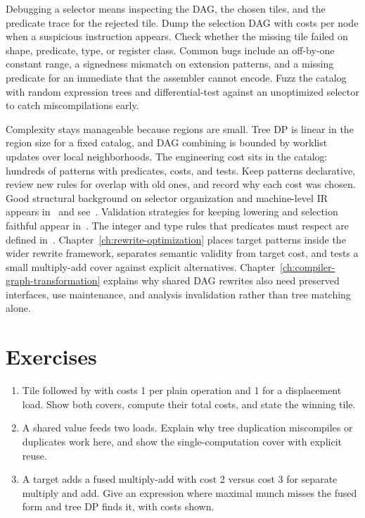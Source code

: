 Debugging a selector means inspecting the DAG, the chosen tiles, and the predicate trace for the rejected tile.
Dump the selection DAG with costs per node when a suspicious instruction appears.
Check whether the missing tile failed on shape, predicate, type, or register class.
Common bugs include an off-by-one constant range, a signedness mismatch on extension patterns, and a missing predicate for an immediate that the assembler cannot encode.
Fuzz the catalog with random expression trees and differential-test against an unoptimized selector to catch miscompilations early.

Complexity stays manageable because regions are small.
Tree DP is linear in the region size for a fixed catalog, and DAG combining is bounded by worklist updates over local neighborhoods.
The engineering cost sits in the catalog: hundreds of patterns with predicates, costs, and tests.
Keep patterns declarative, review new rules for overlap with old ones, and record why each cost was chosen.
Good structural background on selector organization and machine-level IR appears in~\cite{appel-1998-modern} and see~\cite{morgan-1998-optimizing}.
Validation strategies for keeping lowering and selection faithful appear in~\cite{safonov-2010-trustworthy}.
The integer and type rules that predicates must respect are defined in~\cite{wg14-2011-c11}.
Chapter~\ref{ch:rewrite-optimization} places target patterns inside the wider rewrite framework, separates semantic validity from target cost, and tests a small multiply-add cover against explicit alternatives.
Chapter~\ref{ch:compiler-graph-transformation} explains why shared DAG rewrites also need preserved interfaces, use maintenance, and analysis invalidation rather than tree matching alone.

\section{Exercises}\label{sec:ch25-exercises}

\begin{enumerate}
\item Tile  followed by  with costs 1 per plain operation and 1 for a displacement load. \label{ex:ch25-displacement} Show both covers, compute their total costs, and state the winning tile.
\item A shared value  feeds two loads. \label{ex:ch25-sharing} Explain why tree duplication miscompiles or duplicates work here, and show the single-computation cover with explicit reuse.
\item A target adds a fused multiply-add with cost 2 versus cost 3 for separate multiply and add. \label{ex:ch25-fma-cost} Give an expression where maximal munch misses the fused form and tree DP finds it, with costs shown.
\end{enumerate}

